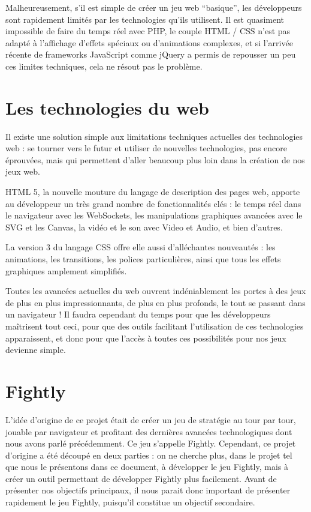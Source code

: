 \documentclass[a4paper,10pt]{report}
\begin{document}
      Malheureusement, s’il est simple de créer un jeu web “basique”, les développeurs sont rapidement limités par les technologies qu’ils utilisent. Il est quasiment impossible de faire du temps réel avec PHP, le couple HTML / CSS n’est pas adapté à l’affichage d’effets spéciaux ou d’animations complexes, et si l’arrivée récente de frameworks JavaScript comme jQuery a permis de repousser un peu ces limites techniques, cela ne résout pas le problème.

    \section{Les technologies du web}

      Il existe une solution simple aux limitations techniques actuelles des technologies web : se tourner vers le futur et utiliser de nouvelles technologies, pas encore éprouvées, mais qui permettent d’aller beaucoup plus loin dans la création de nos jeux web.

      HTML 5, la nouvelle mouture du langage de description des pages web, apporte au développeur un très grand nombre de fonctionnalités clés : le temps réel dans le navigateur avec les WebSockets, les manipulations graphiques avancées avec le SVG et les Canvas, la vidéo et le son avec Video et Audio, et bien d’autres.

      La version 3 du langage CSS offre elle aussi d’alléchantes nouveautés : les animations, les transitions, les polices particulières, ainsi que tous les effets graphiques amplement simplifiés.

      Toutes les avancées actuelles du web ouvrent indéniablement les portes à des jeux de plus en plus impressionnants, de plus en plus profonds, le tout se passant dans un navigateur ! Il faudra cependant du temps pour que les développeurs maîtrisent tout ceci, pour que des outils facilitant l’utilisation de ces technologies apparaissent, et donc pour que l’accès à toutes ces possibilités pour nos jeux devienne simple.

    \section{Fightly}

      L'idée d'origine de ce projet était de créer un jeu de stratégie au tour par tour, jouable par navigateur et profitant des dernières avancées technologiques dont nous avons parlé précédemment. Ce jeu s'appelle Fightly. Cependant, ce projet d'origine a été découpé en deux parties : on ne cherche plus, dans le projet tel que nous le présentons dans ce document, à développer le jeu Fightly, mais à créer un outil permettant de développer Fightly plus facilement. Avant de présenter nos objectifs principaux, il nous parait donc important de présenter rapidement le jeu Fightly, puisqu'il constitue un objectif secondaire. 
      
\end{document}
